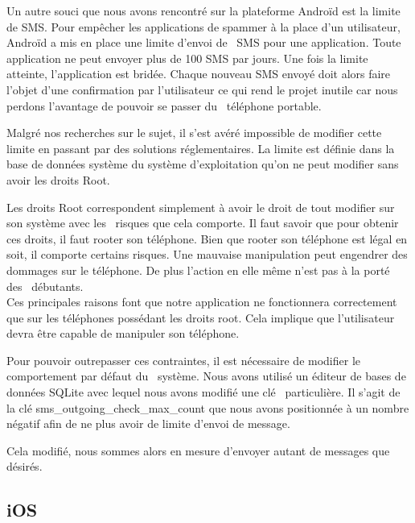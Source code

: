 Un autre souci que nous avons rencontré sur la plateforme Androïd est la limite de SMS. Pour empêcher
les applications de spammer à la place d'un utilisateur, Androïd a mis en place une limite d'envoi de 
SMS pour une application. Toute application ne peut envoyer plus de 100 SMS par jours. Une fois la limite
atteinte, l'application est bridée. Chaque nouveau SMS envoyé doit alors faire l'objet d'une confirmation
par l'utilisateur ce qui rend le projet inutile car nous perdons l'avantage de pouvoir se passer du 
téléphone portable.

Malgré nos recherches sur le sujet, il s'est avéré impossible de modifier cette limite en passant par
des solutions réglementaires. La limite est définie dans la base de données système du système d'exploitation
qu'on ne peut modifier sans avoir les droits Root.

Les droits Root correspondent simplement à avoir le droit de tout modifier sur son système avec les 
risques que cela comporte. Il faut savoir que pour obtenir ces droits, il faut rooter son téléphone.
Bien que rooter son téléphone est légal en soit, il comporte certains risques. Une mauvaise manipulation
peut engendrer des dommages sur le téléphone. De plus l'action en elle même n'est pas à la porté des 
débutants.
\\


Ces principales raisons font que notre application ne fonctionnera correctement que sur les téléphones
possédant les droits root. Cela implique que l'utilisateur devra être capable de manipuler son téléphone.

Pour pouvoir outrepasser ces contraintes, il est nécessaire de modifier le comportement par défaut du 
système. Nous avons utilisé un éditeur de bases de données SQLite avec lequel nous avons modifié une clé 
particulière. Il s'agit de la clé sms\_outgoing\_check\_max\_count que nous avons positionnée à un nombre négatif afin de ne plus avoir de limite d'envoi de message.

Cela modifié, nous sommes alors en mesure d'envoyer autant de messages que désirés. 




\subsection{iOS}

